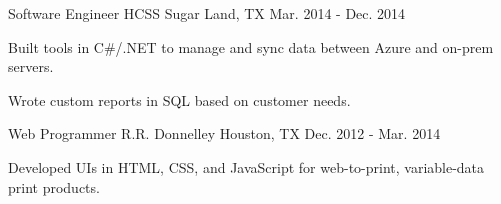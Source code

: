 \begin{cventries}
\cventry
{Software Engineer} %
{HCSS} %
{Sugar Land, TX} %
{Mar. 2014 - Dec. 2014} %
{
\begin{cvitems}
\item {Built tools in C\#/.NET to manage and sync data between Azure and on-prem servers.}
\item {Wrote custom reports in SQL based on customer needs.}
\end{cvitems}
}


\cventry
{Web Programmer} %
{R.R. Donnelley} %
{Houston, TX} %
{Dec. 2012 - Mar. 2014} %
{
\begin{cvitems}
\item {Developed UIs in HTML, CSS, and JavaScript for web-to-print, variable-data print products.}
\end{cvitems}
}

\end{cventries}
